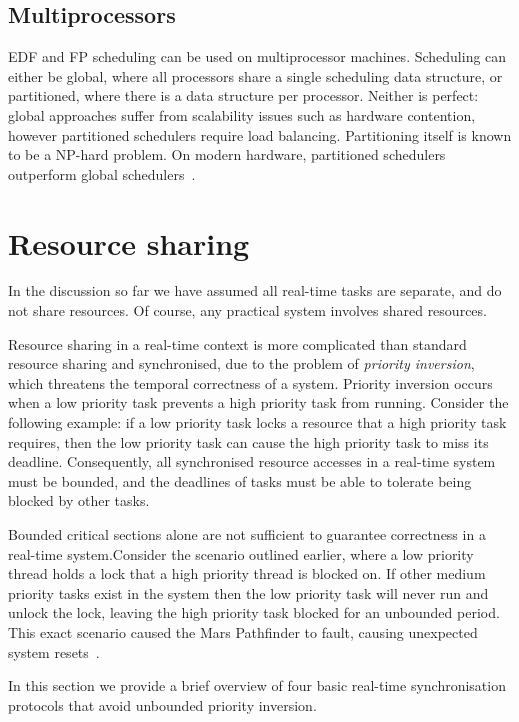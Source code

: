 \subsection{Multiprocessors}

\gls{EDF} and \gls{FP} scheduling can be used on multiprocessor machines.
Scheduling can either be global, where all processors share a single scheduling data structure, or partitioned, where there is a data structure per processor.
 Neither is perfect: global approaches suffer from scalability issues such as hardware contention, however partitioned schedulers require load balancing.
Partitioning itself is known to be a NP-hard problem.
On modern hardware, partitioned schedulers outperform global schedulers~\citep{Brandenburg:phd}.

\section{Resource sharing}
\label{sec:resource-sharing-theory}

In the discussion so far we have assumed all real-time tasks are separate, and do not share resources.
Of course, any practical system involves shared resources.

Resource sharing in a real-time context is more complicated than standard resource sharing and synchronised, due to the problem of \emph{priority inversion}, which threatens the temporal correctness of a system.
Priority inversion occurs when a low priority task prevents a high priority task from running.
Consider the following example: if a low priority task locks a resource that a high priority task requires, then the low priority task can cause the high priority task to miss its deadline.
Consequently, all synchronised resource accesses in a real-time system must be bounded, and the deadlines of tasks must be able to tolerate being blocked by other tasks.

Bounded critical sections alone are not sufficient to guarantee correctness in a real-time system.Consider the scenario outlined earlier, where a low priority thread holds a lock that a high priority thread is blocked on.
If other medium priority tasks exist in the system then the low priority task will never run and unlock the lock, leaving the high priority task blocked for an unbounded period.
This exact scenario caused the Mars Pathfinder to fault, causing unexpected system resets~\citep{Mars_Pathfinder}.

In this section we provide a brief overview of four basic real-time synchronisation protocols that avoid unbounded priority inversion.

